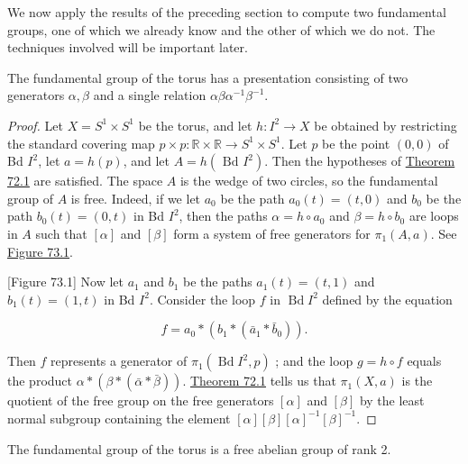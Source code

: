 We now apply the results of the preceding section to compute two fundamental groups, one of which we already know and the other of which we do not. The techniques involved will be important later.

\begin{theorem}
\label{thm:\thetheorem}
The fundamental group of the torus has a presentation consisting of two generators \(\alpha ,\beta\) and a single relation \({\alpha \beta }{\alpha }^{-1}{\beta }^{-1}\).
\end{theorem}

\begin{proof}
Let \(X = S^{1} \times {S}^{1}\) be the torus, and let \(h : I^{2} \rightarrow X\) be obtained by restricting the standard covering map \(p \times p : \mathbb{R} \times \mathbb{R} \rightarrow {S}^{1} \times {S}^{1}\). Let \(p\) be the point \(( {0,0})\) of Bd \(I^{2}\), let \(a = h( p)\), and let \(A = h( {\text{ Bd }I^{2}})\). Then the hypotheses of \hyperref[thm:72.1]{Theorem 72.1} are satisfied.
The space \(A\) is the wedge of two circles, so the fundamental group of \(A\) is free. Indeed, if we let \(a_{0}\) be the path \(a_{0}( t) = ( {t,0})\) and \(b_{0}\) be the path \(b_{0}( t) = ( {0,t})\) in Bd \(I^{2}\), then the paths \(\alpha = h \circ {a}_{0}\) and \(\beta = h \circ {b}_{0}\) are loops in \(A\) such that \([ \alpha ]\) and \([ \beta ]\) form a system of free generators for \({\pi }_{1}( {A,a})\). See \hyperref[fig:73.1]{Figure 73.1}.

[Figure 73.1]
Now let \(a_{1}\) and \(b_{1}\) be the paths \(a_{1}( t) = ( {t,1})\) and \(b_{1}( t) = ( {1,t})\) in Bd \(I^{2}\). Consider the loop \(f\) in \(\operatorname{Bd}I^{2}\) defined by the equation

\[
f = a_{0} * ( {b_{1} * ( {\bar{a}_{1} * \bar{b}_{0}}) }).
\]

Then \(f\) represents a generator of \({\pi }_{1}( {\operatorname{Bd}I^{2},p})\) ; and the loop \(g = h \circ f\) equals the product \(\alpha * ( {\beta * ( {\bar{\alpha } * \bar{\beta }}) })\). \hyperref[thm:72.1]{Theorem 72.1} tells us that \({\pi }_{1}( {X,a})\) is the quotient of the free group on the free generators \([ \alpha ]\) and \([ \beta ]\) by the least normal subgroup containing the element \([ \alpha ] [ \beta ] {[ \alpha ] }^{-1}{[ \beta ] }^{-1}\).
\end{proof}
\begin{corollary}
\label{cor:\thetheorem}
The fundamental group of the torus is a free abelian group of rank 2.
\end{corollary}

